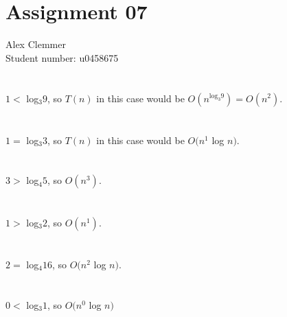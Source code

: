 \documentclass[a4paper]{article}
\begin{document}
\section*{Assignment 07}
Alex Clemmer\\
Student number: u0458675

\section{}

$1 <$ log$_3 9$, so $T(n)$ in this case would be $O(n^{\mbox{log}_3 9}) = O(n^2)$.

\section{}

$1 =$ log$_3 3$, so $T(n)$ in this case would be $O(n^1$ log $n)$.

\section{}

$3 >$ log$_4 5$, so $O(n^3)$.

\section{}

$1 >$ log$_3 2$, so $O(n^1)$.

\section{}

$2 =$ log$_4 16$, so $O(n^2$ log $n)$.

\section{}

$0 <$ log$_3 1$, so $O(n^0$ log $n)$
\end{document}
